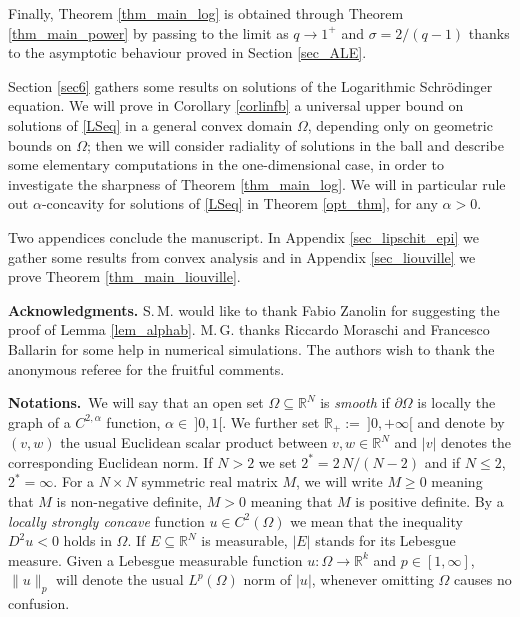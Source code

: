 \documentclass[12pt]{amsart}
\numberwithin{equation}{section}
\theoremstyle{plain}
\theoremstyle{plain}
\theoremstyle{plain}
\theoremstyle{definition}
\newcommand{\R}{{\mathbb R}}
\renewcommand{\le}{\leqslant}
\renewcommand{\ge}{\geqslant}
\begin{document}
Finally, Theorem \ref{thm_main_log} is obtained through Theorem \ref{thm_main_power} by passing to the limit as $q\to 1^+$ and $\sigma=2/(q-1)$ thanks to the asymptotic behaviour proved in Section \ref{sec_ALE}. 

\smallskip

Section \ref{sec6} gathers some results on solutions of the Logarithmic Schr\"odinger equation. 
We will prove in Corollary \ref{corlinfb} a universal upper bound on solutions of \eqref{LSeq} in a general convex domain $\Omega$, depending only on geometric bounds on $\Omega$; then we will consider radiality of solutions in the ball and describe some elementary computations in the one-dimensional case, in order to investigate the sharpness of Theorem \ref{thm_main_log}. 
We will in particular rule out $\alpha$-concavity for solutions of \eqref{LSeq} in Theorem \ref{opt_thm}, for any $\alpha>0$. 

\smallskip

Two appendices conclude the manuscript. In Appendix \ref{sec_lipschit_epi} we gather some results from convex analysis and in Appendix \ref{sec_liouville} we prove Theorem \ref{thm_main_liouville}.

\medskip

 {\bf Acknowledgments.}
 S.$\,$M. would like to thank Fabio Zanolin for suggesting the proof of Lemma \ref{lem_alphab}. 
M.$\,$G. thanks Riccardo Moraschi and Francesco Ballarin for some help in numerical simulations. 
The authors wish to thank the anonymous referee for the fruitful comments.
 
 \medskip

{\bf Notations.}\
We will say that an open set $\Omega\subseteq\R^N$ is {\em smooth} if $\partial\Omega$ is locally the graph of a $C^{2,\alpha}$ function, $\alpha\in \ ]0, 1[$.
We further set $\R_+:=\ ]0,+\infty[$ and denote by $(v, w)$ the usual Euclidean scalar product between $v, w\in \R^N$ and $|v|$ denotes the corresponding Euclidean norm. 
If $N>2$ we set $2^*=2\, N/(N-2)$ and if $N\le 2$, $2^*=\infty$. 
For a $N\times N$ symmetric real matrix $M$, we will write $M\ge 0$ meaning that $M$ is non-negative definite, $M>0$ meaning that $M$ is positive definite.
By a \emph{locally strongly concave} function $u\in C^2(\Omega)$ we mean that the inequality $D^2 u <0$ holds in $\Omega$. If $E\subseteq \R^N$ is measurable, $|E|$ stands for its Lebesgue measure. 
Given a Lebesgue measurable function $u:\Omega\to \R^k$ and $p\in [1, \infty]$, $\|u\|_p$ will denote the usual $L^p(\Omega)$ norm of $|u|$, whenever omitting $\Omega$ causes no confusion. 
\end{document}
